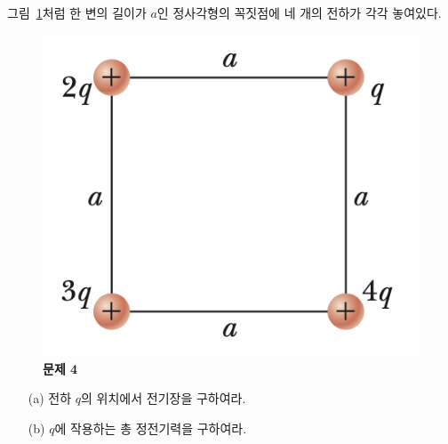 \documentclass[tightenlines,floatfix,nofootinbib,superscriptaddress,fleqn]{revtex4-2}
\begin{document}
 그림~\ref{fig:2}처럼 한 변의 길이가
$a$인 정사각형의 꼭짓점에 네 개의 전하가 각각 놓여있다.
\begin{figure}[htp]
  \centering
  \includegraphics[scale=0.6]{qfig2-2.png}
  \caption{\textbf{문제 4}}
  \label{fig:2}
\end{figure}
\begin{itemize}
\item[(a)] 전하 $q$의 위치에서 전기장을 구하여라.
\item[(b)] $q$에 작용하는 총 정전기력을 구하여라.
\end{itemize}
\vspace{1.cm}
\end{document}
